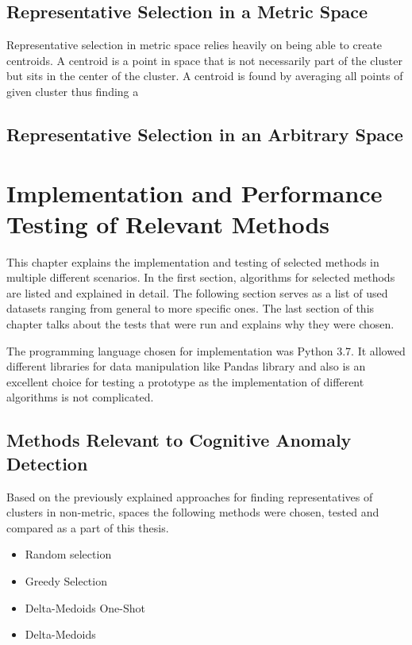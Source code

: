 \documentclass[thesis=B,english]{FITthesis}[2012/10/20]
\begin{document}
\section{Representative Selection in a Metric Space}\label{sec:rep_select_metric}
Representative selection in metric space relies heavily on being able to create centroids.
A centroid is a point in space that is not necessarily part of the cluster but sits in the center of the cluster.
A centroid is found by averaging all points of given cluster thus finding a

\section{Representative Selection in an Arbitrary Space}\label{sec:rep_select_arbitrary}



\chapter{Implementation and Performance Testing of Relevant Methods}

This chapter explains the implementation and testing of selected methods in multiple different scenarios.
In the first section, algorithms for selected methods are listed and explained in detail.
The following section serves as a list of used datasets ranging from general to more specific ones.
The last section of this chapter talks about the tests that were run and explains why they were chosen.

The programming language chosen for implementation was Python 3.7.
It allowed different libraries for data manipulation like Pandas library and also is an excellent choice for testing a prototype as the implementation of different algorithms is not complicated.

\section{Methods Relevant to Cognitive Anomaly Detection}\label{sec:relevant_methods}
Based on the previously explained approaches for finding representatives of clusters in non-metric, spaces the following methods were chosen, tested and compared as a part of this thesis.
\begin{itemize}
    \item Random selection
    \item Greedy Selection
    \item Delta-Medoids One-Shot
    \item Delta-Medoids 
\end{itemize}
\end{document}
